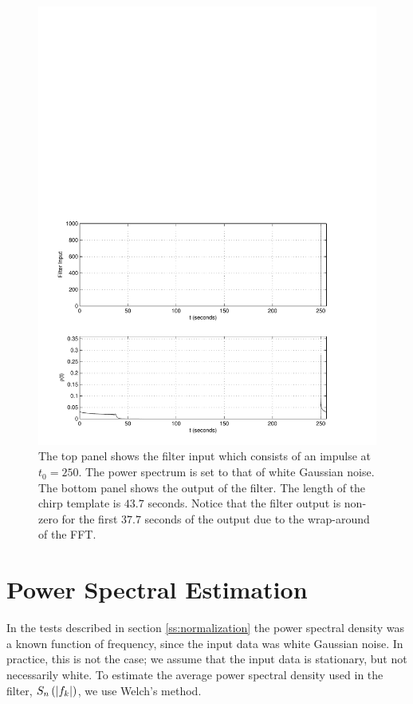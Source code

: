 \begin{figure}[htb]
\label{f:impuse_wraparound}
\begin{center}
\includegraphics[width=\linewidth]{figures/findchirp/impulse_wraparound}
\end{center}
\caption{%
The top panel shows the filter input which consists of an impulse at $t_0 = 250$.
The power spectrum is set to that of white Gaussian noise. The bottom panel
shows the output of the filter. The length of the chirp template is $43.7$
seconds. Notice that the filter output is non-zero for the first $37.7$
seconds of the output due to the wrap-around of the FFT.
}
\end{figure}

\section{Power Spectral Estimation}
\label{ss:psd}

In the tests described in section \ref{ss:normalization} the power spectral
density was a known function of frequency, since the input data was white
Gaussian noise. In practice, this is not the case; we assume that the input
data is stationary, but not necessarily white. To estimate the average power
spectral density used in the filter, $S_n\left(\left|f_{k}\right|\right)$, we use Welch's method\cite{fftbook}. 

